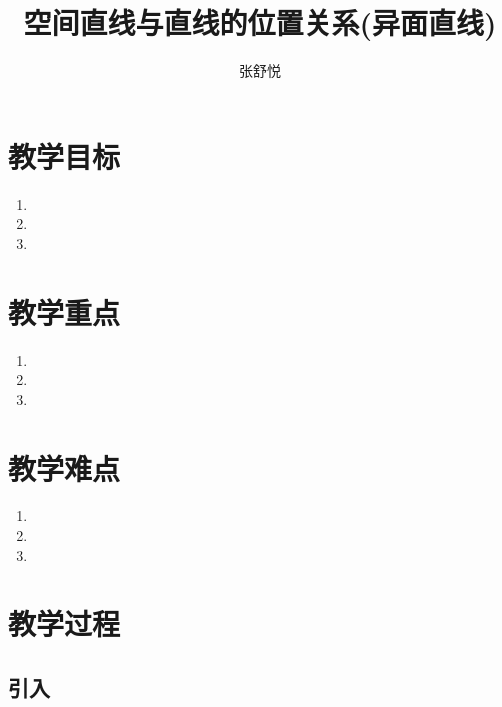 \documentclass{article}
\begin{document}
\begin{CJK}{UTF8}{gkai}

\title{空间直线与直线的位置关系(异面直线)}
\date{}
\author{张舒悦}
\maketitle

\section{教学目标}
\begin{enumerate}
\item 
\item 
\item 
\end{enumerate}

\section{教学重点}
\begin{enumerate}
\item 
\item 
\item 
\end{enumerate}

\section{教学难点}
\begin{enumerate}
\item 
\item 
\item 
\end{enumerate}

\section{教学过程}
\subsection{引入}
\subsubsection{}
\subsubsection{}


\end{CJK}
\end{document}
